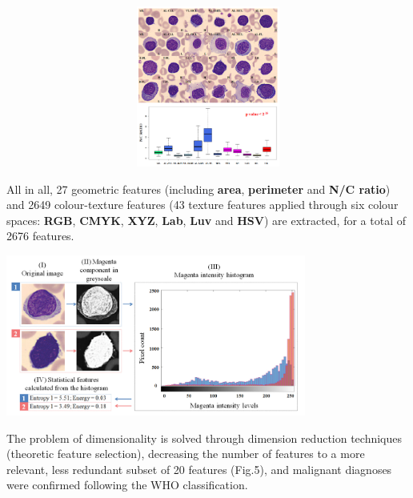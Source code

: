 \documentclass[]{article}
\let\origfigure\figure
\let\endorigfigure\endfigure
\renewenvironment{figure}[1][2] {
    \expandafter\origfigure\expandafter[H]
} {
    \endorigfigure
}
\begin{document}
\begin{figure}[h]

{\centering \includegraphics[width=6in,height=200px,]{./images/3-nc-ratio} 

}

\caption{Examples of different cells, showing differential nucleus/cytoplasm ratio, with associated boxplots (Source: Puigví et al.)}\label{Fig. ncratio}
\end{figure}

All in all, 27 geometric features (including \textbf{area},
\textbf{perimeter} and \textbf{N/C ratio}) and 2649 colour-texture
features (43 texture features applied through six colour spaces:
\textbf{RGB}, \textbf{CMYK}, \textbf{XYZ}, \textbf{Lab}, \textbf{Luv}
and \textbf{HSV}) are extracted, for a total of 2676 features.

\begin{figure}[h]

{\centering \includegraphics[width=1\linewidth,height=200px,]{./images/1-grayscale-intensity-lymph} 

}

\caption{Magenta component grayscale decomposition and associated histogram (Source: Puigví et al.)}\label{Fig. grayscale}
\end{figure}

The problem of dimensionality is solved through dimension reduction
techniques (theoretic feature selection), decreasing the number of
features to a more relevant, less redundant subset of 20 features
(Fig.5), and malignant diagnoses were confirmed following the WHO
classification.
\end{document}
